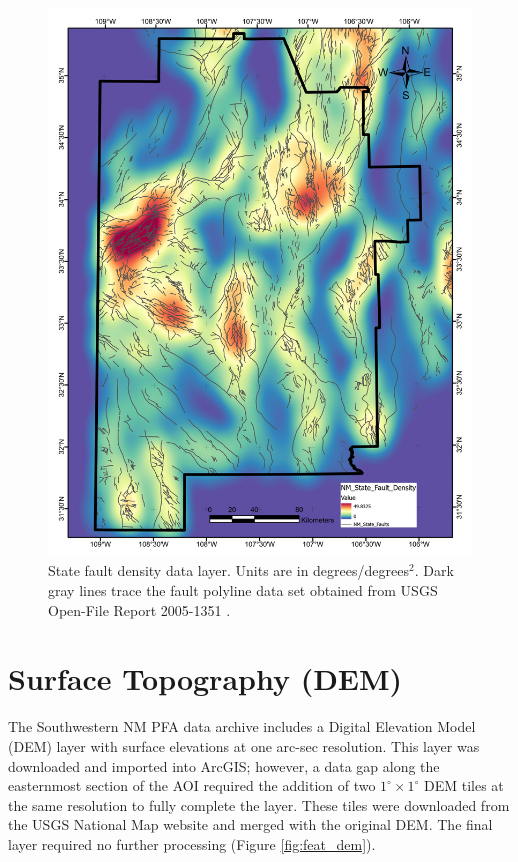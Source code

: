 \begin{figure}[H]
\centering
\includegraphics[width=0.75\linewidth]{templates/images/Figure-StateFaultDensity.pdf}
\caption[State fault density data layer]{State fault density data layer. Units are in degrees/degrees$^2$. Dark gray lines trace the fault polyline data set obtained from USGS Open-File Report 2005-1351 \protect\citep{stoeser_usgs_2005}.}
\label{fig:state_faults}
\end{figure}
\pagebreak

\section{Surface Topography (DEM)}\label{app:dl_dem}
The Southwestern NM PFA data archive \citep{kelley_geothermal_2015} includes a Digital Elevation Model (DEM) layer with surface elevations at one arc-sec resolution. This layer was downloaded and imported into ArcGIS; however, a data gap along the easternmost section of the AOI required the addition of two \(1^\circ\times1^\circ\) DEM tiles at the same resolution to fully complete the layer. These tiles were downloaded from the USGS National Map website \citep{usgs_tnm_2021} and merged with the original DEM. The final layer required no further processing (Figure \ref{fig:feat_dem}).
\vfill
\pagebreak

